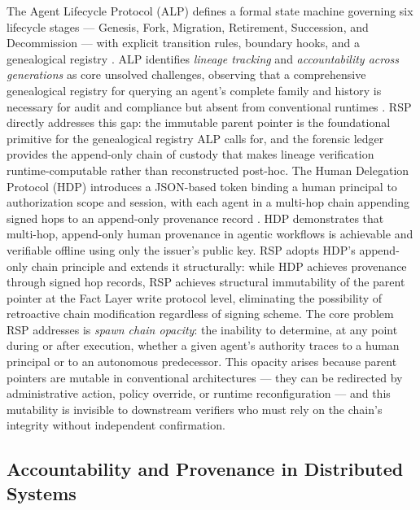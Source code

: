 The Agent Lifecycle Protocol (ALP) defines a formal state machine governing six lifecycle stages --- Genesis, Fork, Migration, Retirement, Succession, and Decommission --- with explicit transition rules, boundary hooks, and a genealogical registry \cite{alp2025}. ALP identifies \emph{lineage tracking} and \emph{accountability across generations} as core unsolved challenges, observing that a comprehensive genealogical registry for querying an agent's complete family and history is necessary for audit and compliance but absent from conventional runtimes \cite{alp2025}. RSP directly addresses this gap: the immutable parent pointer is the foundational primitive for the genealogical registry ALP calls for, and the forensic ledger provides the append-only chain of custody that makes lineage verification runtime-computable rather than reconstructed post-hoc. The Human Delegation Protocol (HDP) introduces a JSON-based token binding a human principal to authorization scope and session, with each agent in a multi-hop chain appending signed hops to an append-only provenance record \cite{hdp-draft,hdp-draft-2}. HDP demonstrates that multi-hop, append-only human provenance in agentic workflows is achievable and verifiable offline using only the issuer's public key. RSP adopts HDP's append-only chain principle and extends it structurally: while HDP achieves provenance through signed hop records, RSP achieves structural immutability of the parent pointer at the Fact Layer write protocol level, eliminating the possibility of retroactive chain modification regardless of signing scheme. The core problem RSP addresses is \emph{spawn chain opacity}: the inability to determine, at any point during or after execution, whether a given agent's authority traces to a human principal or to an autonomous predecessor. This opacity arises because parent pointers are mutable in conventional architectures --- they can be redirected by administrative action, policy override, or runtime reconfiguration --- and this mutability is invisible to downstream verifiers who must rely on the chain's integrity without independent confirmation.

\subsection{Accountability and Provenance in Distributed Systems}

